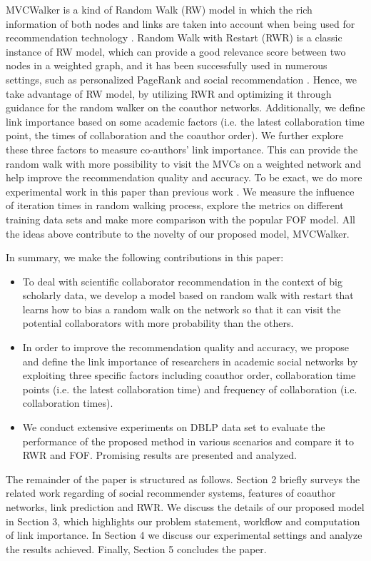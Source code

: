 \documentclass[10pt,journal,compsoc]{IEEEtran}
\begin{document}
 MVCWalker is a kind of Random Walk (RW) model in which the rich information of both nodes and links are taken into account when being used for recommendation technology \cite{Backstrom:Supervised}. Random Walk with Restart (RWR) is a classic instance of RW model, which can provide a good relevance score between two nodes in a weighted graph, and it has been successfully used in numerous settings, such as personalized PageRank and social recommendation \cite{tong2006fast}. Hence, we take advantage of RW model, by utilizing RWR and optimizing it through guidance for the random walker on the coauthor networks. Additionally, we define link importance based on some academic factors (i.e. the latest collaboration time point, the times of collaboration and the coauthor order). We further explore these three factors to measure co-authors' link importance. This can provide the random walk with more possibility to visit the MVCs on a weighted network and help improve the recommendation quality and accuracy. To be exact, we do more experimental work in this paper than previous work \cite{Jing:ACRec}. We measure the influence of iteration times in random walking process, explore the metrics on different training data sets and make more comparison with the popular FOF model. All the ideas above contribute to the novelty of our proposed model, MVCWalker.

In summary, we make the following contributions in this paper:
\begin{itemize}
\item To deal with scientific collaborator recommendation in the context of big scholarly data, we develop a model based on random walk with restart that learns how to bias a random walk on the network so that it can visit the potential collaborators with more probability than the others.
\item In order to improve the recommendation quality and accuracy, we propose and define the link importance of researchers in academic social networks by exploiting three specific factors including coauthor order, collaboration time points (i.e. the latest collaboration time) and frequency of collaboration (i.e. collaboration times).
\item We conduct extensive experiments on DBLP data set to evaluate the performance of the proposed method in various scenarios and compare it to RWR and FOF. Promising results are presented and analyzed.
\end{itemize}

The remainder of the paper is structured as follows. Section 2 briefly surveys the related work regarding of social recommender systems, features of coauthor networks, link prediction and RWR. We discuss the details of our proposed model in Section 3, which highlights our problem statement, workflow and computation of link importance. In Section 4 we discuss our experimental settings and analyze the results achieved. Finally, Section 5 concludes the paper.
\end{document}
